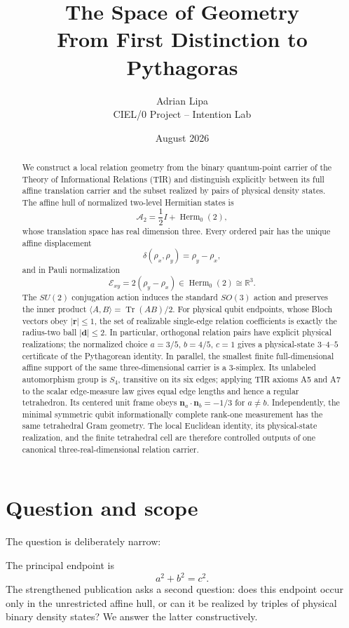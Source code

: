 \documentclass[12pt,a4paper]{article}
\title{\textbf{The Space of Geometry}\\[0.4em]\large From First Distinction to Pythagoras}
\author{Adrian Lipa\\\small CIEL/0 Project -- Intention Lab}
\date{August 2026}
\newcommand{\Herm}{\operatorname{Herm}}
\newcommand{\Tr}{\operatorname{Tr}}
\newcommand{\R}{\mathbb{R}}
\newcommand{\Erel}{\mathcal{E}}
\newcommand{\Astate}{\mathcal{A}_2}
\newcommand{\rvec}{\bm{r}}
\newcommand{\dvec}{\bm{d}}
\newcommand{\nvec}{\bm{n}}
\begin{document}
\maketitle

\begin{abstract}
We construct a local relation geometry from the binary quantum-point carrier of the Theory of Informational Relations (TIR) and distinguish explicitly between its full affine translation carrier and the subset realized by pairs of physical density states. The affine hull of normalized two-level Hermitian states is
\[
\Astate=\frac12 I+\Herm_0(2),
\]
whose translation space has real dimension three. Every ordered pair has the unique affine displacement
\[
\delta(\rho_x,\rho_y)=\rho_y-\rho_x,
\]
and in Pauli normalization
\[
\Erel_{xy}=2(\rho_y-\rho_x)\in\Herm_0(2)\cong\R^3.
\]
The $SU(2)$ conjugation action induces the standard $SO(3)$ action and preserves the inner product $\langle A,B\rangle=\Tr(AB)/2$. For physical qubit endpoints, whose Bloch vectors obey $|\rvec|\le1$, the set of realizable single-edge relation coefficients is exactly the radius-two ball $|\dvec|\le2$. In particular, orthogonal relation pairs have explicit physical realizations; the normalized choice $a=3/5$, $b=4/5$, $c=1$ gives a physical-state $3$--$4$--$5$ certificate of the Pythagorean identity. In parallel, the smallest finite full-dimensional affine support of the same three-dimensional carrier is a $3$-simplex. Its unlabeled automorphism group is $S_4$, transitive on its six edges; applying TIR axioms A5 and A7 to the scalar edge-measure law gives equal edge lengths and hence a regular tetrahedron. Its centered unit frame obeys $\nvec_a\cdot\nvec_b=-1/3$ for $a\ne b$. Independently, the minimal symmetric qubit informationally complete rank-one measurement has the same tetrahedral Gram geometry. The local Euclidean identity, its physical-state realization, and the finite tetrahedral cell are therefore controlled outputs of one canonical three-real-dimensional relation carrier.
\end{abstract}

\section{Question and scope}

The question is deliberately narrow:
\begin{center}
\end{center}
The principal endpoint is
\[
\boxed{a^2+b^2=c^2.}
\]
The strengthened publication asks a second question: does this endpoint occur only in the unrestricted affine hull, or can it be realized by triples of physical binary density states? We answer the latter constructively.
\end{document}
